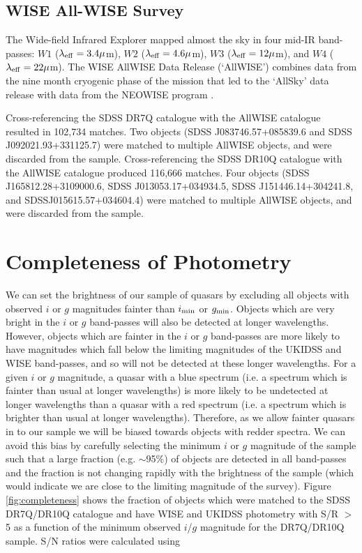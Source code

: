 \subsection{WISE All-WISE Survey}

The Wide-field Infrared Explorer \citep[WISE;][]{wright10} mapped almost the sky in four mid-IR band-passes: $W1$ ($\lambda_{\rm eff} = 3.4\mu$m), $W2$ ($\lambda_{\rm eff} = 4.6\mu$m), $W3$ ($\lambda_{\rm eff} = 12\mu$m), and $W4$ ($\lambda_{\rm eff} = 22\mu$m). The WISE AllWISE Data Release (`AllWISE') combines data from the nine month cryogenic phase of the mission that led to the `AllSky' data release with data from the NEOWISE program \citep{mainzer11}. 

Cross-referencing the SDSS DR7Q catalogue with the AllWISE catalogue resulted in 102,734 matches. Two objects (SDSS J083746.57+085839.6 and SDSS J092021.93+331125.7) were matched to multiple AllWISE objects, and were discarded from the sample. Cross-referencing the SDSS DR10Q catalogue with the AllWISE catalogue produced 116,666 matches. Four objects (SDSS J165812.28+3109000.6, SDSS J013053.17+034934.5, SDSS J151446.14+304241.8, and SDSSJ015615.57+034604.4) were matched to multiple AllWISE objects, and were discarded from the sample. 


\section{Completeness of Photometry}

We can set the brightness of our sample of quasars by excluding all objects with observed $i$ or $g$ magnitudes fainter than $i_{\rm min}$ or $g_{\rm min}$. Objects which are very bright in the $i$ or $g$ band-passes will also be detected at longer wavelengths. However, objects which are fainter in the $i$ or $g$ band-passes are more likely to have magnitudes which fall below the limiting magnitudes of the UKIDSS and WISE band-passes, and so will not be detected at these longer wavelengths. For a given $i$ or $g$ magnitude, a quasar with a blue spectrum (i.e. a spectrum which is fainter than usual at longer wavelengths) is more likely to be undetected at longer wavelengths than a quasar with a red spectrum (i.e. a spectrum which is brighter than usual at longer wavelengths). Therefore, as we allow fainter quasars in to our sample we will be biased towards objects with redder spectra. We can avoid this bias by carefully selecting the minimum $i$ or $g$ magnitude of the sample such that a large fraction (e.g. $\sim$95\%) of objects are detected in all band-passes and the fraction is not changing rapidly with the brightness of the sample (which would indicate we are close to the limiting magnitude of the survey). Figure \ref{fig:completeness} shows the fraction of objects which were matched to the SDSS DR7Q/DR10Q catalogue and have WISE and UKIDSS photometry with S/R $>$ 5 as a function of the minimum observed $i$/$g$ magnitude for the DR7Q/DR10Q sample. S/N ratios were calculated using

